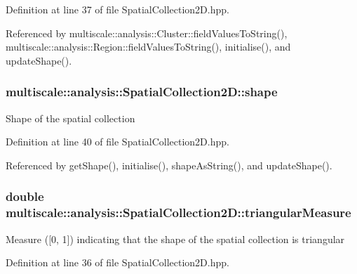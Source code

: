 Definition at line 37 of file Spatial\-Collection2\-D.\-hpp.



Referenced by multiscale\-::analysis\-::\-Cluster\-::field\-Values\-To\-String(), multiscale\-::analysis\-::\-Region\-::field\-Values\-To\-String(), initialise(), and update\-Shape().

\hypertarget{classmultiscale_1_1analysis_1_1SpatialCollection2D_a4df95ecca90ce33332a69e0aefcf73d9}{
\subsubsection[{shape}]{ multiscale\-::analysis\-::\-Spatial\-Collection2\-D\-::shape\hspace{0.3cm}{\ttfamily [protected]}}}\label{classmultiscale_1_1analysis_1_1SpatialCollection2D_a4df95ecca90ce33332a69e0aefcf73d9}
Shape of the spatial collection 

Definition at line 40 of file Spatial\-Collection2\-D.\-hpp.



Referenced by get\-Shape(), initialise(), shape\-As\-String(), and update\-Shape().

\hypertarget{classmultiscale_1_1analysis_1_1SpatialCollection2D_a578070e91858e9e87de1e0f5771d6c3f}{
\subsubsection[{triangular\-Measure}]{\setlength{\rightskip}{0pt plus 5cm}double multiscale\-::analysis\-::\-Spatial\-Collection2\-D\-::triangular\-Measure\hspace{0.3cm}{\ttfamily [protected]}}}\label{classmultiscale_1_1analysis_1_1SpatialCollection2D_a578070e91858e9e87de1e0f5771d6c3f}
Measure (\mbox{[}0, 1\mbox{]}) indicating that the shape of the spatial collection is triangular 

Definition at line 36 of file Spatial\-Collection2\-D.\-hpp.




